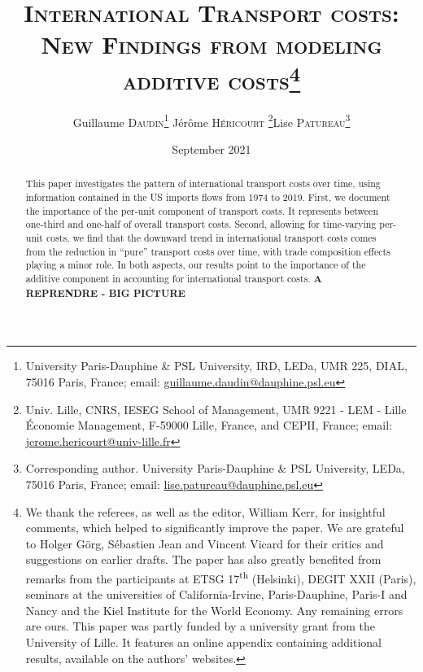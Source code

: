 \documentclass[a4paper,11pt]{article}
\begin{document}
\title{\textsc{International Transport costs:\\New Findings from modeling additive costs}\thanks{We thank the referees, as well as the editor, William Kerr, for insightful comments, which helped to significantly improve the paper. We are grateful to Holger G\"{o}rg, S\'{e}bastien Jean and Vincent Vicard for their critics and suggestions on earlier drafts. The paper has also greatly benefited from remarks from the participants at ETSG 17\textsuperscript{th} (Helsinki), DEGIT XXII (Paris), seminars at the universities of California-Irvine, Paris-Dauphine, Paris-I and Nancy and the Kiel Institute for the World Economy. Any remaining errors are ours. This paper was partly funded by a university grant from the University of Lille. It features an online appendix containing additional results, available on the authors' websites.}}

\author{Guillaume \textsc{Daudin}\thanks{%
University Paris-Dauphine \& PSL University, IRD, LEDa, UMR 225, DIAL, 75016 Paris, France; email: \url{guillaume.daudin@dauphine.psl.eu}}  \qquad J\'{e}r\^{o}me \textsc{H\'{e}ricourt} \thanks{Univ. Lille, CNRS, IESEG School of Management, UMR 9221 - LEM - Lille Économie Management, F-59000 Lille, France, and CEPII, France; email: \url{jerome.hericourt@univ-lille.fr}}\qquad Lise \textsc{Patureau}\thanks{Corresponding author.
University Paris-Dauphine \& PSL University, LEDa, 75016 Paris, France;  email: \url{lise.patureau@dauphine.psl.eu} } }


\date{September 2021}
 \maketitle
\bigskip

\begin{abstract}
This paper investigates the pattern of international transport costs over time, using information contained in the US imports flows from 1974 to 2019. First, we document the importance of the per-unit component of transport costs. It represents between one-third and one-half of overall transport costs. Second, allowing for time-varying per-unit costs, we find that the downward trend in international transport costs comes from the reduction in ``pure'' transport costs over time, with trade composition effects playing a minor role. In both aspects, our results point to the importance of the additive component in accounting for international transport costs. \textbf{A REPRENDRE - BIG PICTURE}
\end{abstract}
\end{document}
